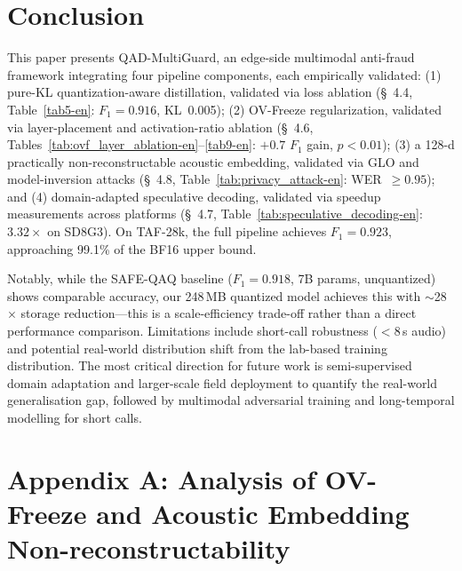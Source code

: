 \documentclass[11pt, a4paper]{article}
\begin{document}
\section{Conclusion}

This paper presents QAD-MultiGuard, an edge-side multimodal anti-fraud framework integrating four pipeline components, each empirically validated: (1) pure-KL quantization-aware distillation, validated via loss ablation (\S~4.4, Table~\ref{tab5-en}: $F_1=0.916$, KL~0.005); (2) OV-Freeze regularization, validated via layer-placement and activation-ratio ablation (\S~4.6, Tables~\ref{tab:ovf_layer_ablation-en}--\ref{tab9-en}: $+0.7$ $F_1$ gain, $p<0.01$); (3) a 128-d practically non-reconstructable acoustic embedding, validated via GLO and model-inversion attacks (\S~4.8, Table~\ref{tab:privacy_attack-en}: WER~$\ge 0.95$); and (4) domain-adapted speculative decoding, validated via speedup measurements across platforms (\S~4.7, Table~\ref{tab:speculative_decoding-en}: $3.32\times$ on SD8G3). On TAF-28k, the full pipeline achieves $F_1 = 0.923$, approaching 99.1\% of the BF16 upper bound.

Notably, while the SAFE-QAQ baseline ($F_1 = 0.918$, 7B params, unquantized) shows comparable accuracy, our 248\,MB quantized model achieves this with $\sim$28$\times$ storage reduction---this is a scale-efficiency trade-off rather than a direct performance comparison. Limitations include short-call robustness ($<$8\,s audio) and potential real-world distribution shift from the lab-based training distribution. The most critical direction for future work is semi-supervised domain adaptation and larger-scale field deployment to quantify the real-world generalisation gap, followed by multimodal adversarial training and long-temporal modelling for short calls.

\appendix
\section*{Appendix A: Analysis of OV-Freeze and Acoustic Embedding Non-reconstructability}
\end{document}
